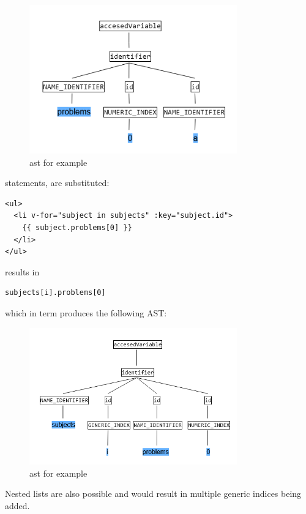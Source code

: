\begin{figure}[H]
    \includegraphics[width=0.8\textwidth]{images/ast_problems_0_a.png}
     \caption{\gls{ast} for example }
     \label{fig:ast_list_simple}
\end{figure}


 statements, are substituted:
\begin{lstlisting}[style=html]
<ul>
  <li v-for="subject in subjects" :key="subject.id">
    {{ subject.problems[0] }}
  </li>
</ul>
\end{lstlisting}
results in
\begin{lstlisting}[style=html]
subjects[i].problems[0]
\end{lstlisting}
which in term produces the following AST:

\begin{figure}[H]
    \includegraphics[width=0.8\textwidth]{images/ast_numeric_generic.png}
     \caption{\gls{ast} for example }
     \label{fig:ast_list_complex}
\end{figure}

Nested lists are also possible and would result in multiple generic indices being added.

